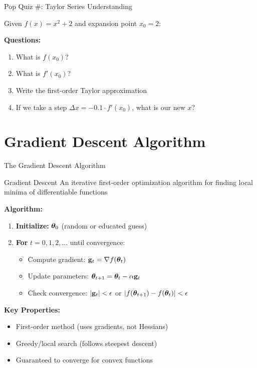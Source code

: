 \documentclass[usenames,dvipsnames]{beamer}
\begin{document}
  \begin{frame}{Pop Quiz \#\thepopquiz: Taylor Series Understanding}
    \begin{popquizbox}{\thepopquiz}
    Given $f(x) = x^2 + 2$ and expansion point $x_0 = 2$:
    
    \textbf{Questions:}
    \begin{enumerate}
        \item What is $f(x_0)$?
        \item What is $f'(x_0)$?
        \item Write the first-order Taylor approximation
        \item If we take a step $\Delta x = -0.1 \cdot f'(x_0)$, what is our new $x$?
    \end{enumerate}
    \end{popquizbox}
  \end{frame}

  \section{Gradient Descent Algorithm}

  \begin{frame}{The Gradient Descent Algorithm}
    \begin{definitionbox}{Gradient Descent}
    An iterative first-order optimization algorithm for finding local minima of differentiable functions
    \end{definitionbox}
    
    \pause
    \textbf{Algorithm:}
    \begin{enumerate}[<+->]
        \item \textbf{Initialize:} $\boldsymbol{\theta}_0$ (random or educated guess)
        \item \textbf{For} $t = 0, 1, 2, \ldots$ until convergence:
        \begin{itemize}
            \item Compute gradient: $\mathbf{g}_t = \nabla f(\boldsymbol{\theta}_t)$
            \item Update parameters: $\boldsymbol{\theta}_{t+1} = \boldsymbol{\theta}_t - \alpha \mathbf{g}_t$
            \item Check convergence: $|\mathbf{g}_t| < \epsilon$ or $|f(\boldsymbol{\theta}_{t+1}) - f(\boldsymbol{\theta}_t)| < \epsilon$
        \end{itemize}
    \end{enumerate}
    
    \pause
    \begin{keypointsbox}
    \textbf{Key Properties:}
    \begin{itemize}
        \item First-order method (uses gradients, not Hessians)
        \item Greedy/local search (follows steepest descent)
        \item Guaranteed to converge for convex functions
    \end{itemize}
    \end{keypointsbox}
  \end{frame}
\end{document}

